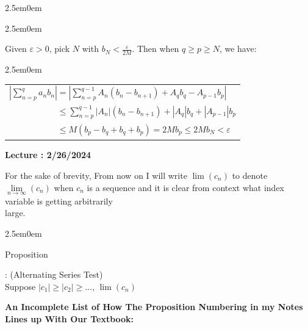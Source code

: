 \documentclass{book}
\newcommand{\hTwo}{%
   \color{MidnightBlue}%
   \fontsize{13}{15}\selectfont%
}
\newcommand{\exOne}{%
   \color{Purple}%
   \fontsize{14}{16}\selectfont%
}
\newenvironment{myIndent}{%
   \begin{adjustwidth}{2.5em}{0em}%
}{%
   \end{adjustwidth}%
}
\newcommand{\retTwo}{\hfill\bigbreak}
\newcounter{LectureNumber}
\newcommand*{\markLecture}[1]{%
   \stepcounter{LectureNumber}%
   {\huge \color{Black} \textbf{Lecture \theLectureNumber: #1} \newline}%
}
\newcounter{PropNumber}
\newcommand{\propCount}[1][1]{%
   \addtocounter{PropNumber}{#1}%
   \thePropNumber%
}
\begin{document}
{\begin{myIndent}
{\begin{myIndent}
         Given $\varepsilon > 0$, pick $N$ with $b_N < \frac{\varepsilon}{2M}$. Then when $q \geq p \geq N$, we have: \\ [6pt]
         \begin{myIndent}
            \begin{tabular}{l}
               $\left| \sum\limits_{n=p}^q{a_nb_n} \right| = \left| \sum\limits_{n=p}^{q-1}{A_n(b_n - b_{n+1})} + A_qb_q - A_{p-1}b_p \right|$ \\
               $\phantom{\left| \sum\limits_{n=p}^q{a_nb_n} \right|} \leq \sum\limits_{n=p}^{q-1}\left|A_n\right|(b_n - b_{n+1}) + |A_q|b_q + |A_{p-1}|b_p$ \\
               $\phantom{\left| \sum\limits_{n=p}^q{a_nb_n} \right|} \leq M(b_p - b_q + b_q + b_p) = 2Mb_p \leq 2Mb_N < \varepsilon$
            \end{tabular}
         \end{myIndent}
      \end{myIndent}} \retTwo
   \end{myIndent}}

   \markLecture{2/26/2024}
   For the sake of brevity, From now on I will write $\lim{(c_n)}$ to denote $\lim\limits_{n\rightarrow \infty}(c_n)$ when $c_n$ is a sequence and it is clear from context what index variable is getting arbitrarily\\ [2 pt] large. \retTwo

   {\begin{myIndent} \hTwo
      Proposition \propCount: (Alternating Series Test)\\ Suppose $|c_1| \geq |c_2| \geq \ldots$, $\lim(c_n)$
      
   \end{myIndent}}

   \newpage
   {\huge \color{Black} \textbf{An Incomplete List of How The Proposition Numbering in my Notes Lines up With Our Textbook:} \retTwo}
   \exOne
   
\end{document}
